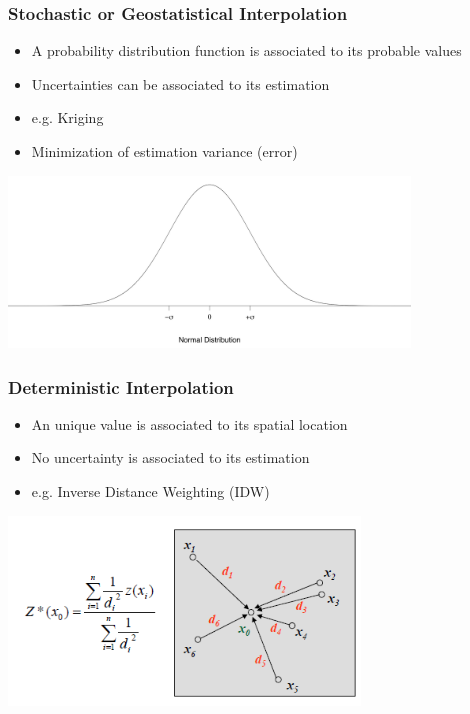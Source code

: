 \documentclass{beamer}
\begin{document}
\begin{frame}
\frametitle{Stochastic or Geostatistical Interpolation}
\begin{itemize}
\item A probability distribution function is associated to its probable values
\item Uncertainties can be associated to its estimation
\item \alert{e.g. Kriging}
\item \alert{Minimization of estimation variance (error)}
\end{itemize}
\includegraphics[width=0.8\textwidth]{Figures/normald.png}
\end{frame}


\begin{frame}
\frametitle{Deterministic Interpolation}
\begin{itemize}
\item An unique value is associated to its spatial location
\item No uncertainty is associated to its estimation
\item \alert{e.g. Inverse Distance Weighting (IDW)}
\end{itemize}
\includegraphics[width=0.7\textwidth]{Figures/idw.png}
\end{frame}

\end{document}

